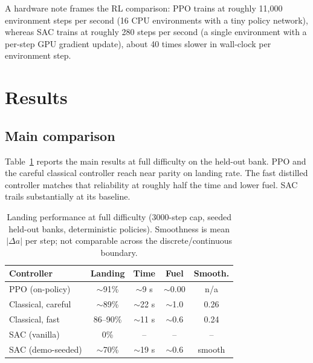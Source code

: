 \documentclass[10pt,twocolumn]{article}
\begin{document}
A hardware note frames the RL comparison: PPO trains at roughly 11{,}000 environment steps per second (16 CPU environments with a tiny policy network), whereas SAC trains at roughly 280 steps per second (a single environment with a per-step GPU gradient update), about 40 times slower in wall-clock per environment step.

\section{Results}

\subsection{Main comparison}
Table~\ref{tab:main} reports the main results at full difficulty on the held-out bank. PPO and the careful classical controller reach near parity on landing rate. The fast distilled controller matches that reliability at roughly half the time and lower fuel. SAC trails substantially at its baseline.

\begin{table}[t]
\centering
\caption{Landing performance at full difficulty (3000-step cap, seeded held-out banks, deterministic policies). Smoothness is mean $|\Delta a|$ per step; not comparable across the discrete/continuous boundary.}
\label{tab:main}
\small
\begin{tabular}{@{}lcccc@{}}
\toprule
Controller & Landing & Time & Fuel & Smooth. \\
\midrule
PPO (on-policy)        & $\sim$91\% & $\sim$9 s  & $\sim$0.00 & n/a \\
Classical, careful     & $\sim$89\% & $\sim$22 s & $\sim$1.0  & 0.26 \\
Classical, fast        & 86--90\%   & $\sim$11 s & $\sim$0.6  & 0.24 \\
SAC (vanilla)          & 0\%        & --         & --         & -- \\
SAC (demo-seeded)      & $\sim$70\% & $\sim$19 s & $\sim$0.6  & smooth \\
\bottomrule
\end{tabular}
\end{table}
\end{document}
